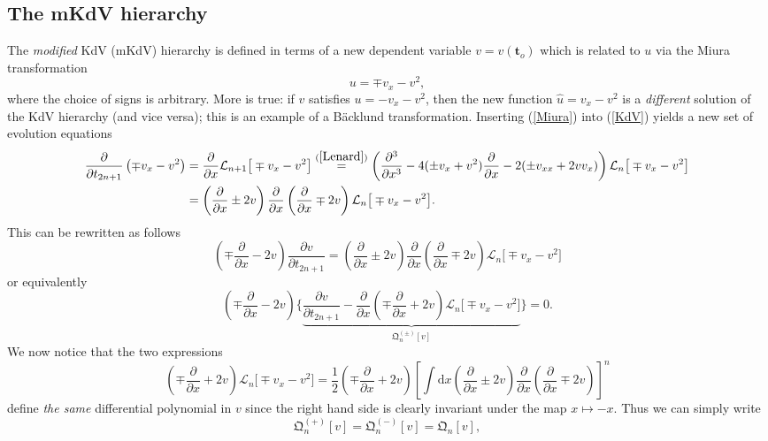 \documentclass[10pt,reqno,oneside]{amsart}
\renewcommand{\d}{{\mathrm d}}
\numberwithin{equation}{section}
\newtheorem{theo}{Theorem}[section]
\def\le{\left}
\def\ri{\right}
\def\bt{\begin{theo}}
\def \pa{\partial}
\def\L{\mathcal L}
\def\wh{\widehat}
\def\eqref#1{(\ref{#1})}
\def\bt{{\mathbf t}}
\begin{document}
\subsection{The mKdV hierarchy}
The {\em modified} KdV (mKdV) hierarchy is defined in terms of a new dependent variable $v = v(\bt_o)$ which is related to $u$ via the Miura transformation 
\begin{equation}\label{Miura}
	u = \mp v_x - v^2,
\end{equation}
where the choice of signs is arbitrary. More is true: if $v$ satisfies $u = -v_x -v^2$,  then the new function $\wh u= v_x -v^2$ is a {\em different} solution of the KdV hierarchy (and vice versa); this is an example of a B\"acklund transformation. Inserting \eqref{Miura} into \eqref{KdV} yields a new set of evolution equations 
\begin{align*}
\frac \pa{\pa t_{2n+1}} \le(\mp v_x - v^2\ri) 
&= \frac \pa{\pa x} \L_{n+1}\big[\mp v_x - v^2\big] 
\stackrel{\eqref{Lenard}}{=} \le(\frac{\pa^3 }{\pa x^3 }- 4(\pm v_x+v^2) \frac{\pa}{\pa x} - 2(\pm v_{xx}+2vv_x)\ri) \L_n\big[\mp v_x-v^2\big]\\
&=\le(\frac \pa{\pa x}  \pm  2v\ri)  \frac \pa{\pa x}\le(\frac \pa{\pa x}  \mp 2v\ri) \L_n\big[\mp v_x-v^2\big].
\end{align*}
This can be rewritten as follows
\begin{equation*}
	\le(\mp\frac \pa{\pa x}  -  2v\ri)  \frac{\pa v} {\pa t_{2n+1}} =\le(\frac \pa{\pa x}\pm 2v\ri)  \frac \pa{\pa x}\le(\frac \pa{\pa x}\mp 2v\ri)  \L_n\big[\mp v_x - v^2\big]
\end{equation*}
or equivalently 
\begin{equation}\label{weakmKdV}
\le(\mp\frac \pa{\pa x}  - 2v\ri) \Bigg\{\underbrace{ \frac{\pa v} {\pa t_{2n+1}} 
-\frac \pa{\pa x}\le( \mp \frac \pa{\pa x}   +  2v\ri) \L_n\big[ \mp v_x-v^2\big]}_{\mathfrak Q_{n}^{(\pm)}[v]}
\Bigg\}  =0.
\end{equation}
We now notice that the two expressions 
\begin{equation}\label{fact}
	\le( \mp \frac \pa{\pa x}   +  2v\ri) \L_n\big[ \mp v_x-v^2\big]=\frac{1}{2}
	\le( \mp  \frac \pa{\pa x}   +  2v\ri)   \le[\int \d x \le(\frac \pa{\pa x}\pm 2v\ri)  \frac \pa{\pa x}\le(\frac \pa{\pa x} \mp 2v\ri)\ri]^{n} 
\end{equation}
define {\em the same} differential polynomial in $v$ since the right hand side is clearly invariant under the map $x \mapsto -x$.  Thus we can simply write 
\begin{equation*}
	\mathfrak Q_{n}^{(+)}[v]= \mathfrak Q_{n}^{(-)}[v]=\mathfrak Q_{n}[v],
\end{equation*}	
\end{document}

